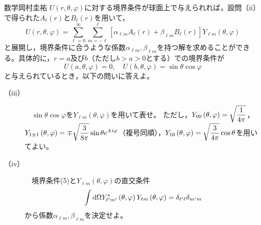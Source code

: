 \documentclass[fleqn]{jbook}
\begin{document}
\begin{question}{数学}{岡村圭祐}
    $U\left( r,\theta,\varphi \right)$に対する境界条件が球面上で与えられれば，設問（ii）で得られた$A_\ell\left( r \right)$と$B_\ell\left( r \right)$を用いて，
    \begin{equation}
U\left( {r,\theta ,\varphi } \right) = \sum\limits_{\ell = 0}^\infty  {\sum\limits_{m =  - \ell }^{\ell } {\left[ {\alpha _{\ell m} A_\ell \left( r \right) + \beta _{\ell m} B_\ell \left( r \right)} \right]Y_{\ell m} \left( {\theta ,\varphi } \right)} } 
    \end{equation}
    と展開し，境界条件に合うような係数$\alpha _{\ell m},\beta _{\ell m}$を持つ解を求めることができる。具体的に，$r=a$及び$b$（ただし$b>a>0$とする）での境界条件が
    \begin{equation}
    U\left( {a,\theta ,\varphi } \right)=0,\quad U\left( {b,\theta ,\varphi } \right)=\sin\theta\cos\varphi
    \end{equation}
    と与えられているとき，以下の問いに答えよ。\\
    
    \begin{description}
    
        \item[{\rm （iii）}] 　$\sin\theta\cos\varphi$を$Y_{\ell m}\left( \theta,\varphi \right)$を用いて表せ。%
        ただし，$\displaystyle Y_{00}\left( \theta,\varphi \right)=\sqrt{\frac{1}{4\pi}}$，$\displaystyle Y_{1 \pm 1}\left( \theta,\varphi \right)=\mp\sqrt{\frac{3}{8\pi}}\sin\theta e^{\pm i\varphi}$（複号同順），$\displaystyle Y_{10}\left( \theta,\varphi \right)=\sqrt{\frac{3}{4\pi}}\cos\theta$を用いてよい。\\
        
        \item[{\rm （iv）}] 　境界条件(5)と$Y_{\ell m}\left( \theta,\varphi \right)$の直交条件
        \begin{equation}
\int {{\rm d}\Omega Y_{\ell'm'} ^ *  \left( {\theta ,\varphi } \right)Y_{\ell m} \left( {\theta ,\varphi } \right)}  = \delta _{\ell'\ell} \delta _{m'm} 
        \end{equation}
        から係数$\alpha _{\ell m},\beta _{\ell m}$を決定せよ。
        
    \end{description}
    

\end{question}


\end{document}
